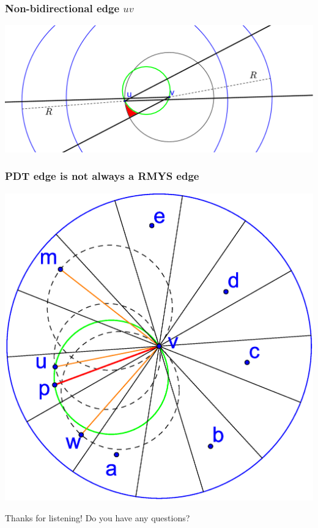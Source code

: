 \documentclass[compress]{beamer}
\begin{document}
\begin{frame}
	\frametitle{Non-bidirectional edge $uv$}
	\center \includegraphics[width=1\linewidth]{RMYS_case_error_bidirectional.eps}
\end{frame}

\begin{frame}
	\frametitle{PDT edge is not always a RMYS edge}
	\center \includegraphics[width=0.7\linewidth]{RMYS_case_one_cone_empty.eps}
\end{frame}


\begin{frame}
\center \Large Thanks for listening!
\center Do you have any questions?
\end{frame}
\end{document}
